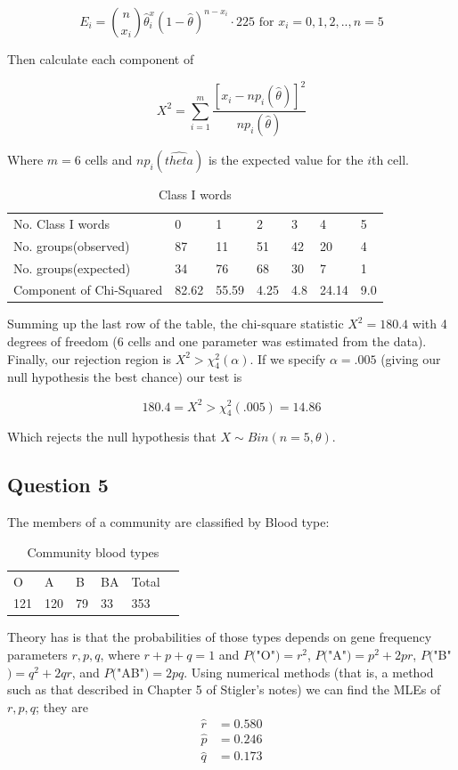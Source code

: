 \documentclass{tufte-book}
\theoremstyle{mytheoremstyle}
\theoremstyle{mylemstyle}
\theoremstyle{mydefstyle}
\begin{document}
\[ E_i = \binom{n}{x_i} \hat{\theta}^x_i (1-\hat{\theta})^{n-x_i} \cdot 225 \text{ for } x_i = 0,1,2,..,n=5 \]

Then calculate each component of

\[ X^2 = \sum_{i=1}^m \frac{[x_i - np_i(\hat{\theta})]^2}{np_i(\hat{\theta})}\]

Where $m=6$ cells and $np_i(\hat{theta})$ is the expected value for the $i$th cell.

\begin{table}
\centering
\begin{tabular}{l|llllll}
No. Class I words & 0 & 1 & 2 & 3 & 4 & 5 \\
No. groups(observed) & 87 & 11 & 51 & 42 & 20 & 4 \\
No. groups(expected) &34&76&68&30&7&1\\
Component of Chi-Squared &82.62&55.59&4.25&4.8&24.14&9.0
\end{tabular}
\caption{Class I words}
\label{millwords}
\end{table}

Summing up the last row of the table, the chi-square statistic $X^2=180.4$ with 4 degrees of freedom (6 cells and one parameter was estimated from the data).  Finally, our rejection region is $X^2 > \chi_4^2(\alpha)$.  If we specify $\alpha=.005$ (giving our null hypothesis the best chance) our test is

\[ 180.4 = X^2 > \chi_4^2(.005) = 14.86 \]

Which rejects the null hypothesis that $X \sim Bin(n=5, \theta)$.


\subsection{Question 5}
The members of a community are classified by Blood type:

\begin{table}
\centering
\begin{tabular}{llllll}
O&A&B&BA&Total\\
121&120&79&33&353
\end{tabular}
\caption{Community blood types}
\label{bloodtypes}
\end{table}

Theory has is that the probabilities of those types depends on gene frequency parameters $r,p,q$, where $r+p+q=1$ and $P($"O"$)=r^2$, $P($"A"$)=p^2+2pr$, $P($"B"$)=q^2+2qr$, and $P($"AB"$)=2pq$.  Using numerical methods (that is, a method such as that described in Chapter 5 of Stigler's notes) we can find the MLEs of $r,p,q$; they are
\begin{align*}
\hat{r} &= 0.580 \\
\hat{p} &= 0.246 \\
\hat{q} &= 0.173 \\
\end{align*}
\end{document}
